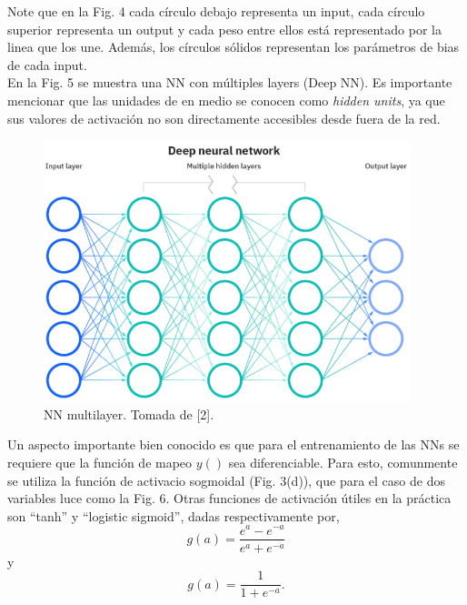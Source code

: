 \documentclass{article}
\begin{document}
Note que en la Fig. 4 cada círculo debajo representa un input, cada círculo superior representa un output y cada peso entre ellos está representado por la linea que los une. Además, los círculos sólidos representan los parámetros de bias de cada input.\\

En la Fig. 5 se muestra una NN con múltiples layers (Deep NN). Es importante mencionar que las unidades de en medio se conocen como \textit{hidden units}, ya que sus valores de activación no son directamente accesibles desde fuera de la red.\\

\begin{figure}[th!]
   \includegraphics[width=0.95\textwidth]{deep.png}
   \caption{NN multilayer. Tomada de [2].}
\end{figure}

Un aspecto importante bien conocido es que para el entrenamiento de las NNs se requiere que la función de mapeo $y()$ sea diferenciable. Para esto, comunmente se utiliza la función de activacio sogmoidal (Fig. 3(d)), que para el caso de dos variables luce como la Fig. 6. Otras funciones de activación útiles en la práctica son ``tanh'' y ``logistic sigmoid'', dadas respectivamente por,
\begin{equation}
    g(a) = \frac{e^a -e^{-a}}{e^a +e^{-a}}
\end{equation}
y
\begin{equation}
    g(a) = \frac{1}{1 +e^{-a}}.
\end{equation}
\end{document}
